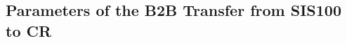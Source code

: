 \begin{longtable*}{ | c | c | c | c | c | c |}
    \end{longtable*}
 
 

  
\subsection{Parameters of the B2B Transfer from SIS100 to CR}
\label{100toCR}


